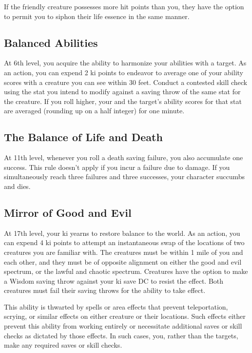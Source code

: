 If the friendly creature possesses more hit points than you, they have the option to permit you to siphon their life essence in the same manner.
\subsection{Balanced Abilities}
At 6th level, you acquire the ability to harmonize your abilities with a target. As an action, you can expend 2 ki points to endeavor to average one of your ability scores with a creature you can see within 30 feet. Conduct a contested skill check using the stat you intend to modify against a saving throw of the same stat for the creature. If you roll higher, your and the target's ability scores for that stat are averaged (rounding up on a half integer) for one minute.
\subsection{The Balance of Life and Death}
At 11th level, whenever you roll a death saving failure, you also accumulate one success. This rule doesn't apply if you incur a failure due to damage. If you simultaneously reach three failures and three successes, your character succumbs and dies.
\subsection{Mirror of Good and Evil}
At 17th level, your ki yearns to restore balance to the world. As an action, you can expend 4 ki points to attempt an instantaneous swap of the locations of two creatures you are familiar with. The creatures must be within 1 mile of you and each other, and they must be of opposite alignment on either the good and evil spectrum, or the lawful and chaotic spectrum. Creatures have the option to make a Wisdom saving throw against your ki save DC to resist the effect. Both creatures must fail their saving throws for the ability to take effect.

This ability is thwarted by spells or area effects that prevent teleportation, scrying, or similar effects on either creature or their locations. Such effects either prevent this ability from working entirely or necessitate additional saves or skill checks as dictated by those effects. In such cases, you, rather than the targets, make any required saves or skill checks.